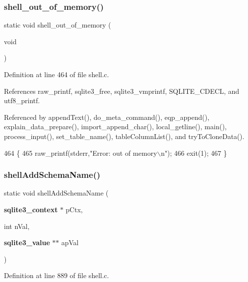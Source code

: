 \subsubsection{shell\+\_\+out\+\_\+of\+\_\+memory()}
{\footnotesize\ttfamily static void shell\+\_\+out\+\_\+of\+\_\+memory (\begin{DoxyParamCaption}\item[{void}]{ }\end{DoxyParamCaption})\hspace{0.3cm}{\ttfamily [static]}}



Definition at line 464 of file shell.\+c.



References raw\+\_\+printf, sqlite3\+\_\+free, sqlite3\+\_\+vmprintf, S\+Q\+L\+I\+T\+E\+\_\+\+C\+D\+E\+CL, and utf8\+\_\+printf.



Referenced by append\+Text(), do\+\_\+meta\+\_\+command(), eqp\+\_\+append(), explain\+\_\+data\+\_\+prepare(), import\+\_\+append\+\_\+char(), local\+\_\+getline(), main(), process\+\_\+input(), set\+\_\+table\+\_\+name(), table\+Column\+List(), and try\+To\+Clone\+Data().


\begin{DoxyCode}
464                                      \{
465   raw_printf(stderr,\textcolor{stringliteral}{"Error: out of memory\(\backslash\)n"});
466   exit(1);
467 \}
\end{DoxyCode}
\mbox{\label{shell_8c_acc3c7edf16cc54d011aa272f91fc9b44}} 
\subsubsection{shell\+Add\+Schema\+Name()}
{\footnotesize\ttfamily static void shell\+Add\+Schema\+Name (\begin{DoxyParamCaption}\item[{\textbf{ sqlite3\+\_\+context} $\ast$}]{p\+Ctx,  }\item[{int}]{n\+Val,  }\item[{\textbf{ sqlite3\+\_\+value} $\ast$$\ast$}]{ap\+Val }\end{DoxyParamCaption})\hspace{0.3cm}{\ttfamily [static]}}



Definition at line 889 of file shell.\+c.




